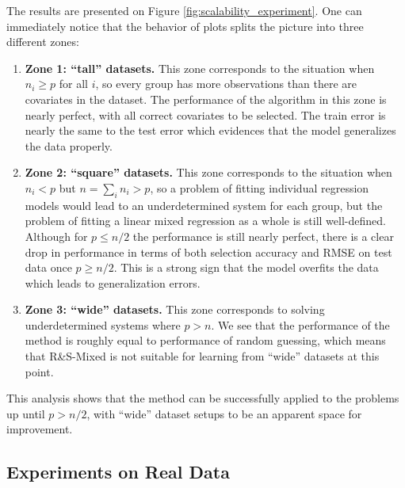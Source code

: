 \documentclass[11pt,letterpaper]{article}
\newcommand{\ouralgo}{R\&S-Mixed }
\numberwithin{equation}{section} %
\numberwithin{figure}{section} %
\numberwithin{table}{section} %
\begin{document}
	The results are presented on Figure \ref{fig:scalability_experiment}. One can immediately notice that the behavior of plots splits the picture into three different zones:
	\begin{enumerate}
		\item \textbf{Zone 1: ``tall'' datasets.} This zone corresponds to the situation when $n_i \geq p$ for all $i$, so every group has more observations than there are covariates in the dataset. The performance of the algorithm in this zone is nearly perfect, with all correct covariates to be selected. The train error is nearly the same to the test error which evidences that the model generalizes the data properly.
		\item \textbf{Zone 2: ``square'' datasets.} This zone corresponds to the situation when $n_i < p$ but $n = \sum_i n_i > p$, so a problem of fitting individual regression models would lead to an underdetermined system for each group, but the problem of fitting a linear mixed regression as a whole is still well-defined. Although for $p \leq n/2$ the performance is still nearly perfect, there is a clear drop in performance in terms of both selection accuracy and RMSE on test data once $p \geq n/2$. This is a strong sign that the model overfits the data which leads to generalization errors.
		\item \textbf{Zone 3: ``wide'' datasets.} This zone corresponds to solving underdetermined systems where $p > n$. We see that the performance of the method is roughly equal to performance of random guessing, which means that \ouralgo is not suitable for learning from ``wide'' datasets at this point.
	\end{enumerate}
	This analysis shows that the method can be successfully applied to the problems up until $p > n/2$, with ``wide'' dataset setups to be an apparent space for improvement.
	
\subsection{Experiments on Real Data}
\label{ch:experiments_on_real_data}
\end{document}
